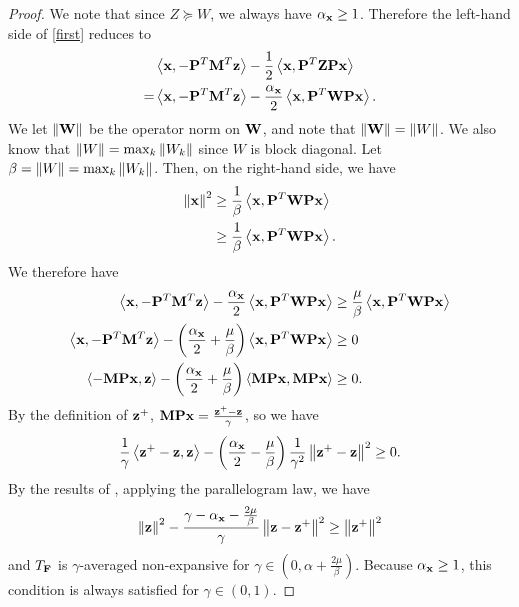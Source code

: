 \begin{proof}
We note that since $Z \succeq W$, we always have $\alpha_{\mathbf{x}} \geq 1$.
Therefore the left-hand side of \eqref{first} reduces to
\begin{align}
& \left\langle \mathbf{x}, -\mathbf{P}^T\mathbf{M}^T \mathbf{z}\right\rangle - \frac{1}{2}\left\langle \mathbf{x}, \mathbf{P}^T \mathbf{Z} \mathbf{P} \mathbf{x}\right\rangle \\
=& \left\langle \mathbf{x}, -\mathbf{P}^T\mathbf{M}^T \mathbf{z}\right\rangle - \frac{\alpha_{\mathbf{x}}}{2}\left\langle \mathbf{x}, \mathbf{P}^T \mathbf{W} \mathbf{P} \mathbf{x}\right\rangle.
\end{align}
We let $\left\lVert\mathbf{W}\right\rVert$ be the operator norm on $\mathbf{W}$, and note that $\left\lVert\mathbf{W}\right\rVert = \left\lVert W\right\rVert$.
We also know that $\left\lVert W\right\rVert = \max_{k} \left\lVert W_k\right\rVert$ since $W$ is block diagonal.
Let $\beta = \left\lVert W\right\rVert = \max_{k} \left\lVert W_k\right\rVert$.
Then, on the right-hand side, we have
\begin{align}
    \left\lVert\mathbf{x}\right\rVert^2 &\geq \frac{1}{\beta}\left\langle\mathbf{x}, \mathbf{P}^T\mathbf{W}\mathbf{P}\mathbf{x}\right\rangle\\
    &\geq \frac{1}{\beta}\left\langle\mathbf{x}, \mathbf{P}^T\mathbf{W}\mathbf{P}\mathbf{x}\right\rangle.
\end{align}
We therefore have
\begin{align}
    \left\langle \mathbf{x}, -\mathbf{P}^T\mathbf{M}^T \mathbf{z}\right\rangle - \frac{\alpha_{\mathbf{x}}}{2}\left\langle \mathbf{x}, \mathbf{P}^T \mathbf{W} \mathbf{P} \mathbf{x}\right\rangle &\geq \frac{\mu}{\beta}\left\langle\mathbf{x}, \mathbf{P}^T\mathbf{W}\mathbf{P}\mathbf{x}\right\rangle \\
    \left\langle \mathbf{x}, -\mathbf{P}^T\mathbf{M}^T \mathbf{z}\right\rangle - \left(\frac{\alpha_{\mathbf{x}}}{2} + \frac{\mu}{\beta}\right)\left\langle \mathbf{x}, \mathbf{P}^T \mathbf{W} \mathbf{P} \mathbf{x}\right\rangle &\geq 0\\
    \left\langle -\mathbf{M}\mathbf{P}\mathbf{x}, \mathbf{z}\right\rangle - \left(\frac{\alpha_{\mathbf{x}}}{2} + \frac{\mu}{\beta}\right)\left\langle \mathbf{M}\mathbf{P}\mathbf{x}, \mathbf{M}\mathbf{P} \mathbf{x}\right\rangle &\geq 0.\label{second}
\end{align}
By the definition of $\mathbf{z}^+$, $\mathbf{M}\mathbf{P}\mathbf{x} = \frac{\mathbf{z}^+ - \mathbf{z}}{\gamma}$, so we have
\begin{equation}
    \frac{1}{\gamma}\left\langle \mathbf{z}^+ - \mathbf{z}, \mathbf{z}\right\rangle - \left(\frac{\alpha_{\mathbf{x}}}{2} - \frac{\mu}{\beta}\right)\frac{1}{\gamma^2}\left\lVert\mathbf{z}^+ - \mathbf{z}\right\rVert^2 \geq 0.
\end{equation}
By the results of \cite[Appendix A, Theorem 1, eq. 60-61]{bassett2024optimaldesignresolventsplitting}, applying the parallelogram law, we have 
\begin{equation}
    \left\lVert\mathbf{z}\right\rVert^2 - \frac{\gamma - \alpha_{\mathbf{x}} - \frac{2\mu}{\beta}}{\gamma}\left\lVert\mathbf{z} - \mathbf{z}^+\right\rVert^2 \geq \left\lVert\mathbf{z}^+\right\rVert^2
\end{equation}
and $T_{\mathbf{F}}$ is $\gamma$-averaged non-expansive for $\gamma \in \left(0, \alpha + \frac{2\mu}{\beta}\right)$.
Because $\alpha_{\mathbf{x}} \geq 1$, this condition is always satisfied for $\gamma \in (0, 1)$.


\end{proof}
